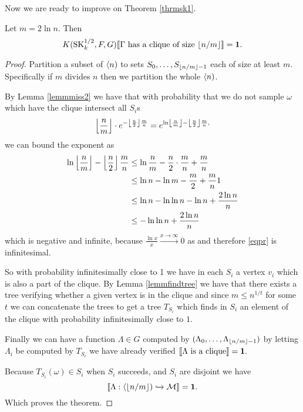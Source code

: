 Now we are ready to improve on Theorem \ref{thrmsk1}.

\begin{thrm}\label{thrmsk}
Let $m = 2 \ln n$. Then
\[K(\text{SK}_k^{1/2},F,G)\llbracket\text{$\Gamma$ has a clique of size $\left \lfloor {n/m} \right \rfloor$}\rrbracket=\textbf{1}.\]
\end{thrm}
\begin{proof}
Partition a subset of $\langle n)$ to sets $S_{0},\dots,S_{\left \lfloor {n/m} \right \rfloor-1}$ each of size at least $m$. Specifically if $m$ divides $n$ then we partition the whole $\langle n)$.

By Lemma \ref{lemmmiss2} we have that with probability that we do not sample $\omega$ which have the clique intersect all $S_i$s 
\begin{align}
\left \lfloor {\frac{n}{m}} \right \rfloor\cdot e^{-\left \lfloor {\frac{n}{2}} \right \rfloor\frac{m}{n}} = e^{\ln\left \lfloor {\frac{n}{m}} \right \rfloor-\left \lfloor {\frac{n}{2}} \right \rfloor\frac{m}{n},}\label{eqpr}
\end{align}
we can bound the exponent as
\begin{align}
\ln\left \lfloor {\frac{n}{m}} \right \rfloor-\left \lfloor {\frac{n}{2}} \right \rfloor\frac{m}{n}&\leq\ln\frac{n}{m}-\frac{n}{2}\cdot\frac{m}{n}+\frac{m}{n}\\
&\leq\ln n - \ln m - \frac{m}{2} + \frac{m}{n}1\\
&\leq \ln n - \ln \ln n - \ln n+\frac{2\ln n}{n}\\
&\leq - \ln \ln n + \frac{2\ln n}{n}
\end{align}
which is negative and infinite, because $\frac{\ln x}{x}\overset{x\to \infty}{\to} 0$ as  and therefore \eqref{eqpr} is infinitesimal.

So with probability infinitesimally close to 1 we have in each $S_i$ a vertex $v_i$ which is also a part of the clique. By Lemma \ref{lemmfindtree} we have that there exists a tree verifying whether a given vertex is in the clique and since $m\leq n^{1/t}$ for some $t$ we can concatenate the trees to get a tree $T_{S_i}$ which finds in $S_i$ an element of the clique with probability infinitesimally close to $1$.

Finally we can have a function $\Lambda\in G$ computed by $(\Lambda_0,\dots,\Lambda_{\left \lfloor {n/m} \right \rfloor-1})$ by letting $\Lambda_i$ be computed by $T_{S_i}$ we have already verified $\llbracket\Lambda\text{ is a clique}\rrbracket=\textbf{1}.$

Because $T_{S_i}(\omega)\in S_i$ when $S_i$ succeeds, and $S_i$ are disjoint we have \[\llbracket\Lambda:\langle \left \lfloor {n/m} \right \rfloor)\xhookrightarrow{} \mathcal{M}\rrbracket=\textbf{1}. \]
Which proves the theorem.
\end{proof}

